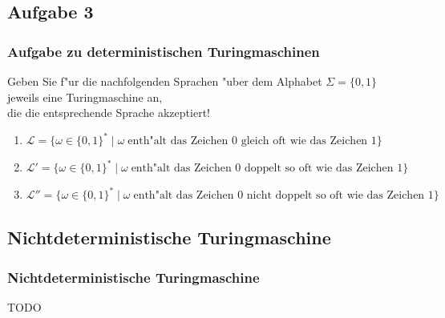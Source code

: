 \subsection{Aufgabe 3}
\begin{frame}
	\frametitle{Aufgabe zu deterministischen Turingmaschinen}
	Geben Sie f"ur die nachfolgenden Sprachen "uber dem Alphabet $\Sigma = \{0,1\}$
	jeweils eine Turingmaschine an,\\
	die die entsprechende Sprache akzeptiert!
	\begin{enumerate}
		\item $\mathcal{L} = \{ \omega \in \{0,1\}^* \; | \; \omega \;
		\mbox{enth"alt das Zeichen $0$ gleich oft wie das Zeichen $1$} \}$
		\item $\mathcal{L}' = \{ \omega \in \{0,1\}^* \; | \; \omega \;
		\mbox{enth"alt das Zeichen $0$ doppelt so oft wie das Zeichen $1$} \}$
		\item $\mathcal{L}'' = \{ \omega \in \{0,1\}^* \; | \; \omega \;
		\mbox{enth"alt das Zeichen $0$ nicht doppelt so oft wie das Zeichen $1$} \}$
	\end{enumerate}
\end{frame}

\subsection{Nichtdeterministische Turingmaschine}
\begin{frame}
	\frametitle{Nichtdeterministische Turingmaschine}
	TODO
\end{frame}

